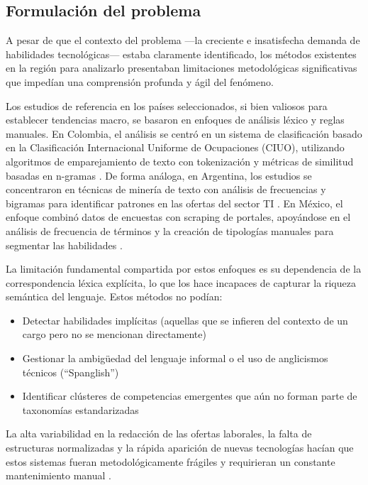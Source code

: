 \subsection{Formulación del problema}

A pesar de que el contexto del problema ---la creciente e insatisfecha demanda de habilidades tecnológicas--- estaba claramente identificado, los métodos existentes en la región para analizarlo presentaban limitaciones metodológicas significativas que impedían una comprensión profunda y ágil del fenómeno.

Los estudios de referencia en los países seleccionados, si bien valiosos para establecer tendencias macro, se basaron en enfoques de análisis léxico y reglas manuales. En Colombia, el análisis se centró en un sistema de clasificación basado en la Clasificación Internacional Uniforme de Ocupaciones (CIUO), utilizando algoritmos de emparejamiento de texto con tokenización y métricas de similitud basadas en n-gramas \cite{rubio2024}. De forma análoga, en Argentina, los estudios se concentraron en técnicas de minería de texto con análisis de frecuencias y bigramas para identificar patrones en las ofertas del sector TI \cite{aguilera2018}. En México, el enfoque combinó datos de encuestas con scraping de portales, apoyándose en el análisis de frecuencia de términos y la creación de tipologías manuales para segmentar las habilidades \cite{martinez2024}.

La limitación fundamental compartida por estos enfoques es su dependencia de la correspondencia léxica explícita, lo que los hace incapaces de capturar la riqueza semántica del lenguaje. Estos métodos no podían:

\begin{itemize}
    \item Detectar habilidades implícitas (aquellas que se infieren del contexto de un cargo pero no se mencionan directamente)
    \item Gestionar la ambigüedad del lenguaje informal o el uso de anglicismos técnicos (``Spanglish'')
    \item Identificar clústeres de competencias emergentes que aún no forman parte de taxonomías estandarizadas
\end{itemize}

La alta variabilidad en la redacción de las ofertas laborales, la falta de estructuras normalizadas y la rápida aparición de nuevas tecnologías hacían que estos sistemas fueran metodológicamente frágiles y requirieran un constante mantenimiento manual \cite{echeverria2022}.

